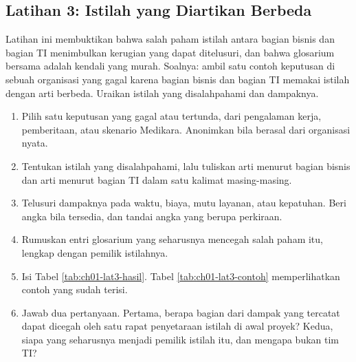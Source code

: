\subsection*{Latihan 3: Istilah yang Diartikan Berbeda}

Latihan ini membuktikan bahwa salah paham istilah antara bagian bisnis dan
bagian TI menimbulkan kerugian yang dapat ditelusuri, dan bahwa glosarium
bersama adalah kendali yang murah. Soalnya: ambil satu contoh keputusan di
sebuah organisasi yang gagal karena bagian bisnis dan bagian TI memakai
istilah dengan arti berbeda. Uraikan istilah yang disalahpahami dan dampaknya.

\begin{enumerate}
  \item Pilih satu keputusan yang gagal atau tertunda, dari pengalaman kerja,
        pemberitaan, atau skenario Medikara. Anonimkan bila berasal dari
        organisasi nyata.
  \item Tentukan istilah yang disalahpahami, lalu tuliskan arti menurut bagian
        bisnis dan arti menurut bagian TI dalam satu kalimat masing-masing.
  \item Telusuri dampaknya pada waktu, biaya, mutu layanan, atau kepatuhan.
        Beri angka bila tersedia, dan tandai angka yang berupa perkiraan.
  \item Rumuskan entri glosarium yang seharusnya mencegah salah paham itu,
        lengkap dengan pemilik istilahnya.
  \item Isi Tabel \ref{tab:ch01-lat3-hasil}. Tabel \ref{tab:ch01-lat3-contoh}
        memperlihatkan contoh yang sudah terisi.
  \item Jawab dua pertanyaan. Pertama, berapa bagian dari dampak yang tercatat
        dapat dicegah oleh satu rapat penyetaraan istilah di awal proyek?
        Kedua, siapa yang seharusnya menjadi pemilik istilah itu, dan mengapa
        bukan tim TI?
\end{enumerate}

